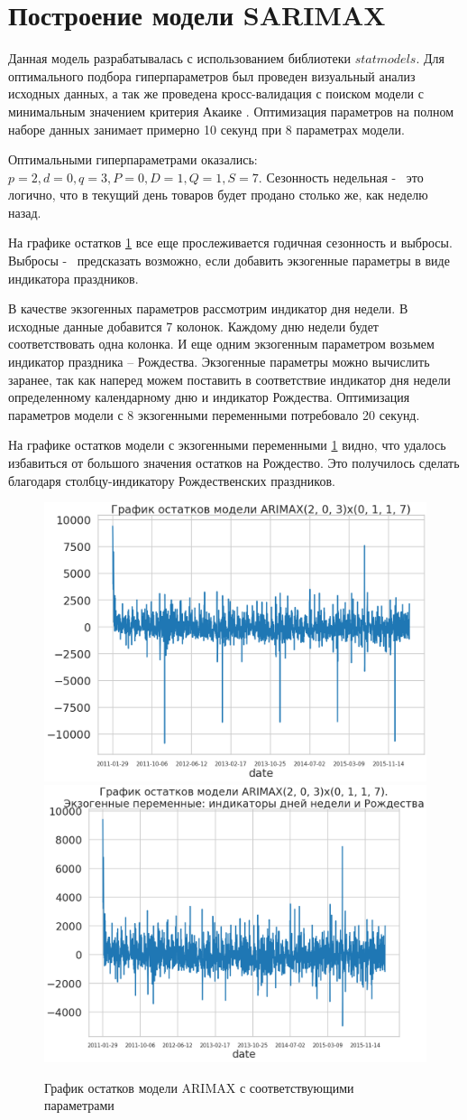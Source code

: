 \section{Построение модели SARIMAX}

Данная модель разрабатывалась с использованием библиотеки $ statmodels $.
Для оптимального подбора гиперпараметров был проведен
визуальный анализ исходных данных, а так же проведена
кросс-валидация с поиском модели с минимальным значением критерия Акаике \cite{akaike}.
Оптимизация параметров на полном наборе данных занимает примерно 10 секунд при 8 параметрах модели.

Оптимальными гиперпараметрами оказались:
$ p = 2, d = 0, q = 3, P = 0, D = 1, Q = 1, S = 7 $.
Сезонность недельная  -~ это логично, что в текущий день
товаров будет продано столько же, как неделю назад.

На графике остатков \ref{img:arimax_resid} все еще прослеживается
годичная сезонность и выбросы. Выбросы -~ предсказать возможно, если
добавить экзогенные параметры в виде индикатора праздников.

В качестве экзогенных параметров рассмотрим индикатор дня недели.
В исходные данные добавится 7 колонок. Каждому дню недели
будет соответствовать одна колонка. И еще одним экзогенным параметром
возьмем индикатор праздника -- Рождества.
Экзогенные параметры можно вычислить заранее, так как наперед можем
поставить в соответствие индикатор дня недели определенному календарному дню
и индикатор Рождества.
Оптимизация параметров модели с 8 экзогенными переменными потребовало 20 секунд.

На графике остатков модели с экзогенными переменными \ref{img:arimax_resid} видно, что удалось избавиться
от большого значения остатков на Рождество. Это получилось сделать благодаря
столбцу-индикатору Рождественских праздников.

\def\figurename{Рис}
\begin{figure}[t]
	\centering
	\includegraphics[width=0.4\columnwidth]{./img/arimax_resid.png}
	\includegraphics[width=0.4\columnwidth]{./img/arimax_resid_with_xmas.png}
	\caption{График остатков модели ARIMAX с соответствующими параметрами}
	\label{img:arimax_resid}
\end{figure}

